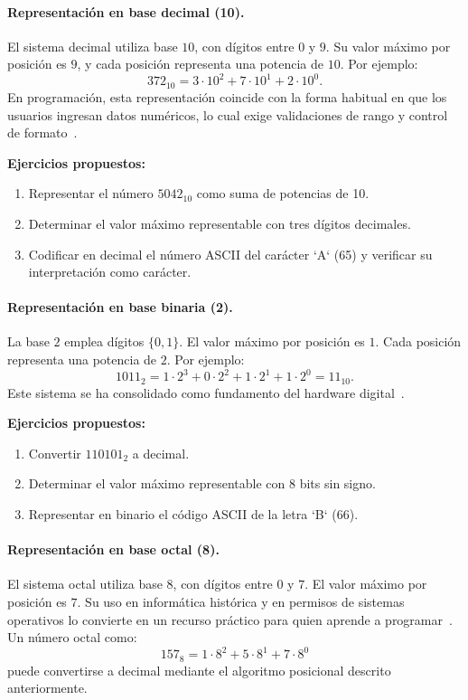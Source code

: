 \documentclass[12pt,twoside]{book}
\begin{document}
						\paragraph{Representación en base decimal (10).} El sistema decimal utiliza base $10$, con dígitos entre $0$ y $9$. Su valor máximo por posición es $9$, y cada posición representa una potencia de $10$. Por ejemplo:
						\[
						372_{10} = 3\cdot10^2 + 7\cdot10^1 + 2\cdot10^0.
						\]
						En programación, esta representación coincide con la forma habitual en que los usuarios ingresan datos numéricos, lo cual exige validaciones de rango y control de formato~\cite{Gaddis2022Starting,Hanly2015Problem}.
						
						\textbf{Ejercicios propuestos:}
						\begin{enumerate}
							\item Representar el número $5042_{10}$ como suma de potencias de 10.
							\item Determinar el valor máximo representable con tres dígitos decimales.
							\item Codificar en decimal el número ASCII del carácter `A` (65) y verificar su interpretación como carácter.
						\end{enumerate}
						
						\paragraph{Representación en base binaria (2).} La base $2$ emplea dígitos $\{0,1\}$. El valor máximo por posición es $1$. Cada posición representa una potencia de $2$. Por ejemplo:
						\[
						1011_2 = 1\cdot2^3 + 0\cdot2^2 + 1\cdot2^1 + 1\cdot2^0 = 11_{10}.
						\]
						Este sistema se ha consolidado como fundamento del hardware digital~\cite{Tanenbaum2021Structured,Wirth1976Algorithms,Gaddis2022Starting}.
						
						\textbf{Ejercicios propuestos:}
						\begin{enumerate}
							\item Convertir $110101_2$ a decimal.
							\item Determinar el valor máximo representable con 8 bits sin signo.
							\item Representar en binario el código ASCII de la letra `B` (66).
						\end{enumerate}
						
						\paragraph{Representación en base octal (8).} El sistema octal utiliza base $8$, con dígitos entre $0$ y $7$. El valor máximo por posición es $7$. Su uso en informática histórica y en permisos de sistemas operativos lo convierte en un recurso práctico para quien aprende a programar~\cite{Tanenbaum2021Structured,Silberschatz2018Operating,Manzano2017Programacion}. Un número octal como:
						\[
						157_8 = 1\cdot8^2 + 5\cdot8^1 + 7\cdot8^0
						\]
						puede convertirse a decimal mediante el algoritmo posicional descrito anteriormente.
						
\end{document}

